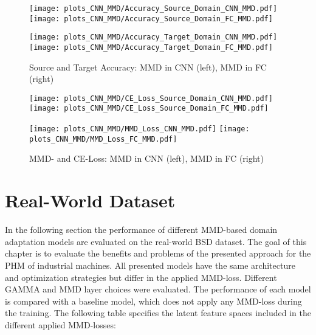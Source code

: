 \begin{figure}[htp]
  \centering
  \texttt{[image: plots\_CNN\_MMD/Accuracy\_Source\_Domain\_CNN\_MMD.pdf]}
  \hspace{.3cm}
  \texttt{[image: plots\_CNN\_MMD/Accuracy\_Source\_Domain\_FC\_MMD.pdf]}

  \vspace{.1cm}

  \texttt{[image: plots\_CNN\_MMD/Accuracy\_Target\_Domain\_CNN\_MMD.pdf]}
  \hspace{.3cm}
  \texttt{[image: plots\_CNN\_MMD/Accuracy\_Target\_Domain\_FC\_MMD.pdf]}

  \caption{Source and Target Accuracy: MMD in CNN (left), MMD in FC (right)}
  \label{fig:accuracy_cnn_and_no_cnn_mmd}
\end{figure}

\begin{figure}[H]
  \centering
  \texttt{[image: plots\_CNN\_MMD/CE\_Loss\_Source\_Domain\_CNN\_MMD.pdf]}
  \hspace{.3cm}
  \texttt{[image: plots\_CNN\_MMD/CE\_Loss\_Source\_Domain\_FC\_MMD.pdf]}

  \vspace{.1cm}

  \texttt{[image: plots\_CNN\_MMD/MMD\_Loss\_CNN\_MMD.pdf]}
  \hspace{.1cm}
  \texttt{[image: plots\_CNN\_MMD/MMD\_Loss\_FC\_MMD.pdf]}

  \caption{MMD- and CE-Loss: MMD in CNN (left), MMD in FC (right)}
  \label{fig:loss_cnn_and_no_cnn_mmd}
\end{figure}

\section{Real-World Dataset}
In the following section the performance of different MMD-based domain adaptation models are evaluated on the real-world BSD dataset. The goal of this chapter is to evaluate the benefits and problems of the presented approach for the PHM of industrial machines. All presented models have the same architecture and optimization strategies but differ in the applied MMD-loss. Different GAMMA and MMD layer choices were evaluated. The performance of each model is compared with a baseline model, which does not apply any MMD-loss during the training. The following table specifies the latent feature spaces included in the different applied MMD-losses:

